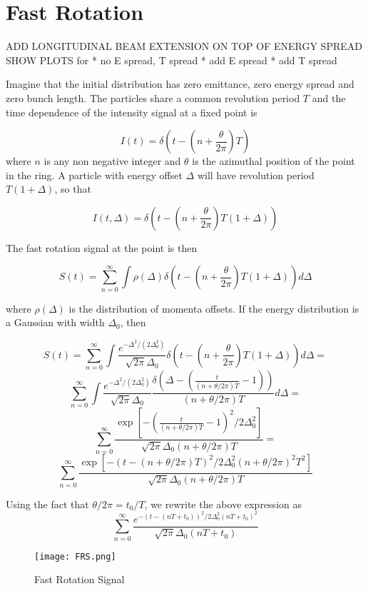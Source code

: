 \section{Fast Rotation}

ADD LONGITUDINAL BEAM EXTENSION ON TOP OF ENERGY SPREAD \newline
SHOW PLOTS for\newline
  * no  E spread, T spread\newline
  * add E spread\newline
  * add T spread\newline

Imagine that the initial distribution has zero emittance, zero energy spread and zero bunch length. The particles share a common revolution period $T$ and the time dependence of the intensity signal at a fixed point is 

\begin{equation}
I(t)=\delta\left(t-\left(n+\frac{\theta}{2\pi}\right)T\right)
\end{equation} 
where $n$ is any non negative integer and $\theta$ is the azimuthal position of the point in the ring. A particle with energy offset $\Delta$ will have revolution period $T(1+\Delta)$, so that 

\begin{equation}
I(t,\Delta)=\delta\left(t-\left(n+\frac{\theta}{2\pi}\right)T\left(1+\Delta\right)\right) 
\end{equation}

The fast rotation signal at the point is then 

\begin{equation}
S(t)=\sum^{\infty}_{n=0}\int\rho(\Delta)\delta\left(t-\left(n+\frac{\theta}{2\pi}\right)T\left(1+\Delta\right)\right)d\Delta 
\end{equation}

where $\rho(\Delta)$ is the distribution of momenta offsets. If the energy distribution is a Gaussian with width $\Delta_0$, then 

\[S(t) =\sum^{\infty}_{n=0}\int\frac{e^{-\Delta^2/(2\Delta^2_0)}}{\sqrt{2\pi}\Delta_0}\delta\left(t-\left(n+\frac{\theta}{2\pi}\right)T\left(1+\Delta\right)\right)d\Delta=\]\[\sum^{\infty}_{n=0}\int\frac{e^{-\Delta^2/(2\Delta^2_0)}}{\sqrt{2\pi}\Delta_0}\frac{\delta\left(\Delta-\left(\frac{t}{(n+\theta/2\pi)T}-1\right)\right)}{(n+\theta/2\pi)T}d\Delta=\]\[\sum^{\infty}_{n=0}\frac{\exp[-(\frac{t}{(n+\theta/2\pi)T}-1)^2/2\Delta^2_0]}{\sqrt{2\pi}\Delta_0(n+\theta/2\pi)T}=\]\[\sum^{\infty}_{n=0}\frac{\exp[-(t-(n+\theta/2\pi)T)^2/2\Delta^2_0(n+\theta/2\pi)^2T^2]}{\sqrt{2\pi}\Delta_0(n+\theta/2\pi)T}\]


Using the fact that $\theta/2\pi=t_0/T$, we rewrite the above expression as 
\begin{equation}
\sum^{\infty}_{n=0}\frac{e^{-(t-(nT+t_0))^2/2\Delta^2_0(nT+t_0)^2}}{\sqrt{2\pi}\Delta_0(nT+t_0)}
\end{equation}

\begin{figure}[here]\begin{center}\texttt{[image: FRS.png]}\caption{Fast Rotation Signal}\end{center}\end{figure}
